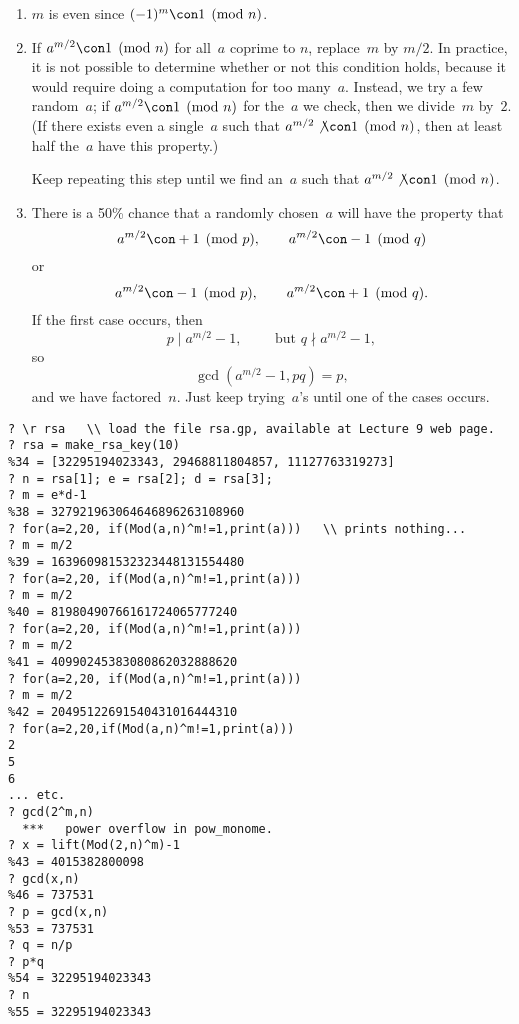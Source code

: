 \documentclass[11pt]{report}
\begin{document}
\begin{enumerate}
  \item $m$ is even since $(-1)^m\con 1\pmod{n}$.
  \item If $a^{m/2}\con 1\pmod{n}$ for all~$a$ coprime to $n$,
        replace~$m$ by $m/2$.  In practice, it is not possible to determine
        whether or not this condition holds, because it would require doing a
        computation for too many~$a$.  Instead, we try a few random~$a$; if
        $a^{m/2}\con 1\pmod{n}$ for the~$a$ we check, then we divide~$m$
        by~$2$.  (If there exists even a single~$a$ such that $a^{m/2}\not\con
          1\pmod{n}$, then at least half the~$a$ have this property.)

        Keep repeating this step until we find an~$a$ such that
        $a^{m/2}\not\con 1\pmod{n}$.

  \item There is a 50\% chance that a randomly chosen~$a$
        will have the property that
        $$a^{m/2}\con+1\pmod{p},\qquad
          a^{m/2}\con -1\pmod{q}$$
        or
        $$a^{m/2}\con -1\pmod{p},\qquad
          a^{m/2}\con +1\pmod{q}.$$
        If the first case occurs, then
        $$p\mid a^{m/2}-1, \qquad \text{ but }
          q\nmid a^{m/2}-1,$$
        so
        $$
          \gcd(a^{m/2}-1,pq) = p,
        $$
        and we have factored~$n$.
        Just keep trying~$a$'s until one of the cases occurs.
\end{enumerate}


\begin{verbatim}
? \r rsa   \\ load the file rsa.gp, available at Lecture 9 web page.
? rsa = make_rsa_key(10)
%34 = [32295194023343, 29468811804857, 11127763319273]
? n = rsa[1]; e = rsa[2]; d = rsa[3];
? m = e*d-1
%38 = 327921963064646896263108960
? for(a=2,20, if(Mod(a,n)^m!=1,print(a)))   \\ prints nothing...
? m = m/2
%39 = 163960981532323448131554480
? for(a=2,20, if(Mod(a,n)^m!=1,print(a)))
? m = m/2
%40 = 81980490766161724065777240
? for(a=2,20, if(Mod(a,n)^m!=1,print(a)))
? m = m/2
%41 = 40990245383080862032888620
? for(a=2,20, if(Mod(a,n)^m!=1,print(a)))
? m = m/2
%42 = 20495122691540431016444310
? for(a=2,20,if(Mod(a,n)^m!=1,print(a)))
2
5
6
... etc.
? gcd(2^m,n)
  ***   power overflow in pow_monome.
? x = lift(Mod(2,n)^m)-1
%43 = 4015382800098
? gcd(x,n)
%46 = 737531
? p = gcd(x,n)
%53 = 737531
? q = n/p
? p*q
%54 = 32295194023343
? n
%55 = 32295194023343
\end{verbatim}
\end{document}
